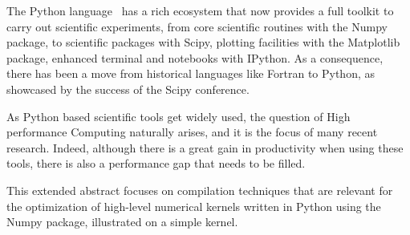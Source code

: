 \documentclass[10pt, preprint, nocopyrightspace]{sigplanconf}
\begin{document}
The Python language~\cite{rossum97} has a rich ecosystem that now provides a
full toolkit to carry out scientific experiments, from core scientific routines
with the Numpy package\cite{oliphant2007,numpyarray2011}, to scientific
packages with Scipy, plotting facilities with the
Matplotlib package, enhanced terminal and notebooks with IPython. As a
consequence, there has been a move from historical languages like Fortran to
Python, as showcased by the success of the Scipy conference.

As Python based scientific tools get widely used, the question of High
performance Computing naturally arises, and it is the focus of many recent
research. Indeed, although there is a great gain in productivity when using
these tools, there is also a performance gap that needs to be filled.

This extended abstract focuses on compilation techniques that are relevant for the
optimization of high-level numerical kernels written in Python using the Numpy
package, illustrated on a simple kernel.

\end{document}
